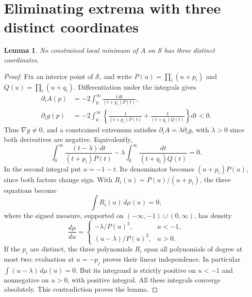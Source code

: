 \documentclass[11pt]{article}
\newtheorem{lemma}{Lemma}
\begin{document}
\section{Eliminating extrema with three distinct coordinates}
\begin{lemma}\label{lower-extrema}
No constrained local minimum of $A$ on $\mathcal S$ has three distinct
coordinates.
\end{lemma}
\begin{proof}
Fix an interior point of $\mathcal S$, and write
$P(u)=\prod_i(u+p_i)$ and $Q(u)=\prod_i(u+q_i)$.
Differentiation under the integrals gives
\begin{align*}
 \partial_i A(p)&=-2\int_0^\infty\frac{t\,dt}{(t+p_i)P(t)},\\
 \partial_i g(p)&=-2\int_0^\infty
 \left\{\frac1{(t+p_i)P(t)}+\frac1{(t+q_i)Q(t)}\right\}dt<0.
\end{align*}
Thus $\nabla g\ne0$, and a constrained extremum satisfies
$\partial_i A=\lambda\partial_i g$, with $\lambda>0$ since both
derivatives are negative. Equivalently,
\[
 \int_0^\infty\frac{(t-\lambda)\,dt}{(t+p_i)P(t)}
 -\lambda\int_0^\infty\frac{dt}{(t+q_i)Q(t)}=0.
\]
In the second integral put $u=-1-t$. Its denominator becomes
$(u+p_i)P(u)$, since both factors change sign. With
$R_i(u)=P(u)/(u+p_i)$, the three equations become
\[
 \int R_i(u)\,d\mu(u)=0,
\]
where the signed measure, supported on $(-\infty,-1)\cup(0,\infty)$, has
density
\[
 \frac{d\mu}{du}=
 \begin{cases}
 -\lambda/P(u)^2,&u<-1,\\
 (u-\lambda)/P(u)^2,&u>0.
 \end{cases}
\]
If the $p_i$ are distinct, the three polynomials $R_i$ span all polynomials
of degree at most two: evaluation at $u=-p_j$ proves their linear independence.
In particular $\int(u-\lambda)\,d\mu(u)=0$. But its integrand is strictly
positive on $u<-1$ and nonnegative on $u>0$, with positive integral.
All these integrals converge absolutely. This contradiction proves the lemma.
\end{proof}
\end{document}
